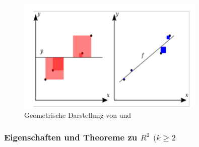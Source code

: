\documentclass[12pt]{article}
\begin{document}
\begin{figure}[htp]
\hspace*{-1.0cm}  
\centering 
\includegraphics[width=0.8\textwidth]{SSE_SST-Definition}
  \caption{Geometrische Darstellung von {\color{blue}{SSE}} und {\color{red}{SST}}}
  \label{fig:SSE-SST-1}
\end{figure}


\subsubsection{Eigenschaften und Theoreme zu $R^2$ $(k \geqslant 2$ } 
\end{document}
